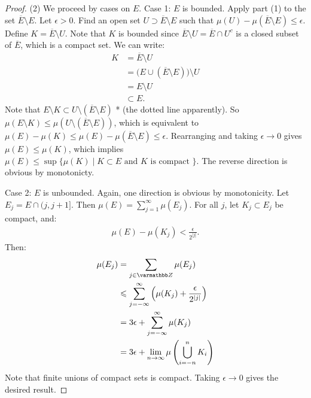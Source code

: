 \begin{proof}
            (2) We proceed by cases on $E$. Case 1: $E$ is bounded.  Apply part (1) to the set $\overline{E} \setminus E$. Let $\epsilon > 0$. Find an open set $U \supset \overline{E} \setminus E$ such that $\mu(U) - \mu(\overline{E} \setminus E) \leq \epsilon$. Define $K = \overline{E} \setminus U$. Note that $K$ is bounded since $\overline{E} \setminus U = \overline{E} \cap U^c$ is a closed subset of $\overline{E}$, which is a compact set. We can write:
                \begin{equation*}
                \begin{split}
                    K 
                    & = \overline{E} \setminus U \\
                    & = \bigl(E \cup (\overline{E} \setminus E)\bigr) \setminus U \\
                    & = E \setminus U \\
                    & \subset E.
                \end{split}
                \end{equation*}
            Note that $E \setminus K \subset U \setminus (\overline{E} \setminus E)$ {\color{red}* (the dotted line apparently)}. So $\mu(E \setminus K) \leq \mu(U \setminus (\overline{E} \setminus E))$, which is equivalent to $\mu(E) - \mu(K) \leq \mu(E) - \mu(\overline{E} \setminus E) \leq \epsilon$. Rearranging and taking $\epsilon \rightarrow 0$ gives $\mu(E) \leq \mu(K)$, which implies $\mu(E) \leq \sup \{\mu(K) \mid K \subset E \text{ and } K \text{ is compact }\}$. The reverse direction is obvious by monotonicty.

            Case 2: $E$ is unbounded. Again, one direction is obvious by monotonicity. Let $E_j = E \cap (j,j+1]$. Then $\mu(E) = \sum_{j = 1}^\infty \mu(E_j)$. For all $j$, let $K_j \subset E_j$ be compact, and:
                \begin{equation*}
                \begin{split}
                    \mu(E) - \mu(K_j) < \frac{\epsilon}{2^{|j|}}.
                \end{split}
                \end{equation*}
            Then:
                \begin{equation*}
                \begin{split}
                    \mu(E_j) 
                    & = \sum_{j \in \bfZ}\mu(E_j) \\
                    & \leq \sum_{j = -\infty}^\infty \left( \mu(K_j) + \frac{\epsilon}{2^{|j|}} \right) \\
                    & = 3\epsilon + \sum_{j = -\infty}^\infty \mu(K_j) \\
                    & = 3\epsilon + \lim_{n \rightarrow \infty} \mu\left(\bigcup_{i = -n}^n K_i\right) \\
                \end{split}
                \end{equation*}
            Note that finite unions of compact sets is compact. Taking $\epsilon \rightarrow 0$ gives the desired result.
        \end{proof}

